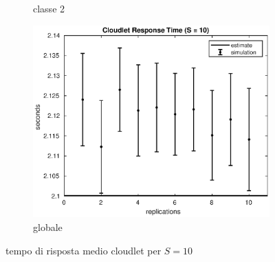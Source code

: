 \begin{figure}[!h]
\begin{subfigure}[t]{0.49\textwidth}
\caption{classe 2}
\label{10_s2clet}
\end{subfigure}
%
\begin{subfigure}[t]{0.5\textwidth}
\includegraphics[width=\textwidth]{figures/simul/10_500K_sclet}
\caption{globale}
\label{10_sclet}
\end{subfigure}
%
\caption{tempo di risposta medio cloudlet per $S = 10$}
\end{figure}
%

